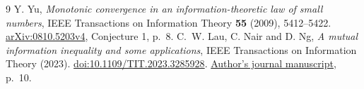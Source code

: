 \documentclass[11pt]{article}
\begin{document}
\begin{thebibliography}{9}
Y. Yu, \emph{Monotonic convergence in an information-theoretic law of
small numbers}, IEEE Transactions on Information Theory
\textbf{55} (2009), 5412--5422.
\href{https://arxiv.org/abs/0810.5203}{arXiv:0810.5203v4},
Conjecture 1, p.~8.
C.~W. Lau, C. Nair and D. Ng,
\emph{A mutual information inequality and some applications},
IEEE Transactions on Information Theory (2023).
\href{https://doi.org/10.1109/TIT.2023.3285928}
{doi:10.1109/TIT.2023.3285928}.
\href{https://davidng-dn.github.io/papers/mutual_information_inequality_journal.pdf}
{Author's journal manuscript}, p.~10.
\end{thebibliography}
\end{document}
